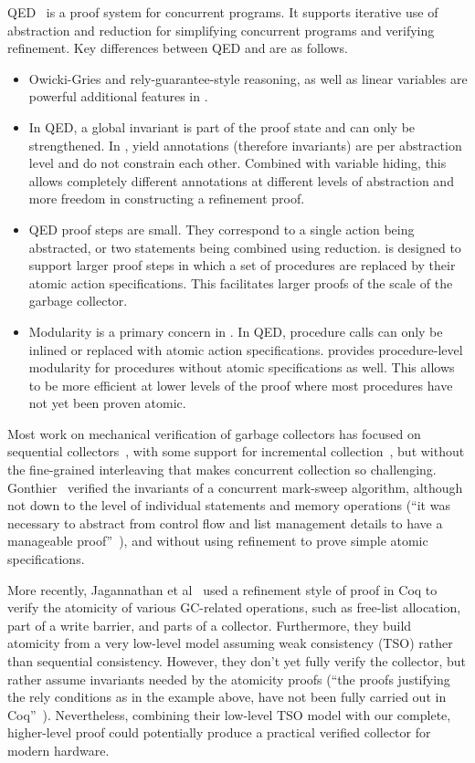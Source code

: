 QED~\cite{ElmasQT09} is a proof system for concurrent programs. It supports iterative use of abstraction and reduction for simplifying concurrent programs and verifying refinement. Key differences between QED and \civl are as follows.
\begin{itemize}
\item Owicki-Gries and rely-guarantee-style reasoning, as well as linear variables are powerful additional features in \civl. 
\item In QED, a global invariant is part of the proof state and can only be strengthened. In \civl, yield annotations (therefore invariants) are per abstraction level and do not constrain each other. Combined with variable hiding, this allows completely different annotations at different levels of abstraction and more freedom in constructing a refinement proof. 
\item QED proof steps are small. They correspond to a single action being abstracted, or two statements being combined using reduction. \civl is designed to support larger proof steps in which a set of procedures are replaced by their atomic action specifications. This facilitates larger proofs of the scale of the garbage collector.  
\item Modularity is a primary concern in \civl. In QED, procedure calls can only be inlined or replaced with atomic action specifications. \civl provides procedure-level modularity for procedures without atomic specifications as well. This allows \civl to be more efficient at lower levels of the proof where most procedures have not yet been proven atomic. 
\end{itemize}

Most work on mechanical verification of garbage collectors has focused on sequential collectors~\cite{mccr07,hawb09},
with some support for incremental collection~\cite{mccr07},
but without the fine-grained interleaving that makes concurrent collection so challenging.
Gonthier~\cite{gont96} verified the invariants of a concurrent mark-sweep algorithm,
although not down to the level of individual statements and memory operations
(``it was necessary to abstract from control flow and list management details to have a manageable proof''~\cite{gont96}),
and without using refinement to prove simple atomic specifications.

More recently,
Jagannathan et al~\cite{Jagannathan14} used a refinement style of proof in Coq to verify the atomicity of various GC-related operations,
such as free-list allocation,
part of a write barrier, and parts of a collector.
Furthermore, they build atomicity from a very low-level model assuming weak consistency (TSO) rather than sequential consistency.
However, they don't yet fully verify the collector,
but rather assume invariants needed by the atomicity proofs
(``the proofs justifying the rely conditions as in the example above,
have not been fully carried out in Coq''~\cite{Jagannathan14}).
Nevertheless, combining their low-level TSO model with our complete,
higher-level proof could potentially produce a practical verified collector for modern hardware.

